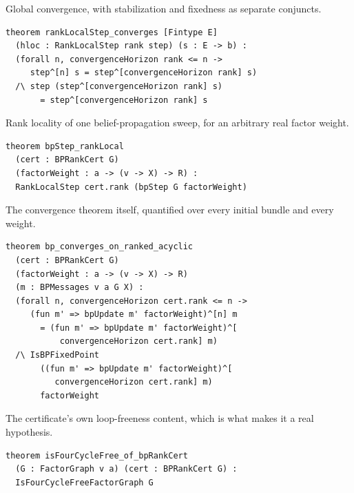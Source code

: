 \documentclass[aps,prx,reprint,nofootinbib,floatfix]{revtex4-2}
\begin{document}
Global convergence, with stabilization and fixedness as separate conjuncts.

{\footnotesize
\begin{lstlisting}[basicstyle=\ttfamily,columns=fullflexible,keepspaces=true,showstringspaces=false,breaklines=true,breakatwhitespace=true,breakindent=1em]
theorem rankLocalStep_converges [Fintype E]
  (hloc : RankLocalStep rank step) (s : E -> b) :
  (forall n, convergenceHorizon rank <= n ->
     step^[n] s = step^[convergenceHorizon rank] s)
  /\ step (step^[convergenceHorizon rank] s)
       = step^[convergenceHorizon rank] s
\end{lstlisting}
}

Rank locality of one belief-propagation sweep, for an arbitrary real factor weight.

{\footnotesize
\begin{lstlisting}[basicstyle=\ttfamily,columns=fullflexible,keepspaces=true,showstringspaces=false,breaklines=true,breakatwhitespace=true,breakindent=1em]
theorem bpStep_rankLocal
  (cert : BPRankCert G)
  (factorWeight : a -> (v -> X) -> R) :
  RankLocalStep cert.rank (bpStep G factorWeight)
\end{lstlisting}
}

The convergence theorem itself, quantified over every initial bundle and every weight.

{\footnotesize
\begin{lstlisting}[basicstyle=\ttfamily,columns=fullflexible,keepspaces=true,showstringspaces=false,breaklines=true,breakatwhitespace=true,breakindent=1em]
theorem bp_converges_on_ranked_acyclic
  (cert : BPRankCert G)
  (factorWeight : a -> (v -> X) -> R)
  (m : BPMessages v a G X) :
  (forall n, convergenceHorizon cert.rank <= n ->
     (fun m' => bpUpdate m' factorWeight)^[n] m
       = (fun m' => bpUpdate m' factorWeight)^[
           convergenceHorizon cert.rank] m)
  /\ IsBPFixedPoint
       ((fun m' => bpUpdate m' factorWeight)^[
          convergenceHorizon cert.rank] m)
       factorWeight
\end{lstlisting}
}

The certificate's own loop-freeness content, which is what makes it a real hypothesis.

{\footnotesize
\begin{lstlisting}[basicstyle=\ttfamily,columns=fullflexible,keepspaces=true,showstringspaces=false,breaklines=true,breakatwhitespace=true,breakindent=1em]
theorem isFourCycleFree_of_bpRankCert
  (G : FactorGraph v a) (cert : BPRankCert G) :
  IsFourCycleFreeFactorGraph G
\end{lstlisting}
}
\end{document}
